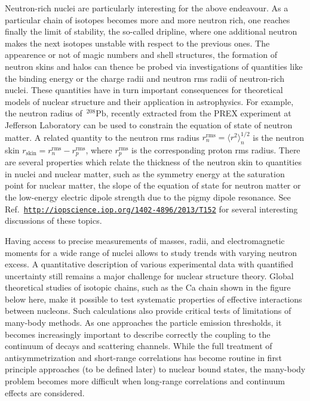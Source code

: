 \documentclass[graybox,sectrefs,envcountresetchap,open=right]{svmonodo}
\begin{document}
Neutron-rich nuclei are particularly interesting for the above endeavour. As a particular chain
of isotopes becomes more and more neutron rich, one reaches finally the limit of stability, the so-called
dripline, where one additional neutron makes the next isotopes unstable with respect 
to the previous ones. The appearence or not of magic numbers and shell structures,
the formation of neutron skins and halos
can thence be probed via investigations of quantities like  the binding energy
or the charge radii and neutron rms radii of neutron-rich nuclei. 
These quantities have in turn important 
consequences for theoretical models of nuclear structure and their application in astrophysics.
For example, the neutron radius of $\,{}^{208}\mbox{Pb}$, recently extracted from the PREX 
experiment at Jefferson Laboratory  can be used to constrain the equation of state of 
neutron matter. A related quantity to the
neutron rms radius $r_n^{\mathrm{rms}}=\langle r^2\rangle_n^{1/2}$ is the neutron skin 
$r_{\mathrm{skin}}=r_n^{\mathrm{rms}}-r_p^{\mathrm{rms}}$,
where $r_p^{\mathrm{rms}}$ is the corresponding proton rms radius.  
There are several properties which relate the thickness of the neutron skin to quantities in nuclei and 
nuclear matter, such as the symmetry energy at the saturation point for nuclear matter, the slope
of the equation of state for neutron matter
or the low-energy electric dipole strength due to the pigmy dipole resonance. 
See Ref.~\href{{http://iopscience.iop.org/1402-4896/2013/T152}}{\nolinkurl{http://iopscience.iop.org/1402-4896/2013/T152}} for several interesting discussions of these topics. 


Having access to precise measurements of masses, radii, and
electromagnetic moments for a wide range of nuclei allows to study
trends with varying neutron excess. A quantitative description of
various experimental data with quantified uncertainty still remains a
major challenge for nuclear structure theory.  Global theoretical
studies of isotopic chains, such as the Ca chain shown in the figure below here, make it possible to test systematic
properties of effective interactions between nucleons. Such calculations also
provide critical tests of limitations of many-body methods. As one
approaches the particle emission thresholds, it becomes increasingly
important to describe correctly the coupling to the continuum of
decays and scattering channels. While the
full treatment of antisymmetrization and short-range correlations has
become routine in first principle  approaches (to be defined later) to nuclear bound states, the
many-body problem becomes more difficult when long-range correlations
and continuum effects are considered.
\end{document}
